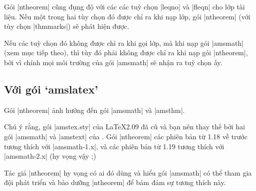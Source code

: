 Gói |ntheorem| cũng đụng độ với các các tuỳ chọn |leqno| và |fleqn| cho
lớp tài liệu. Nếu một trong hai tùy chọn đó được chỉ ra khi nạp lớp,
gói |ntheorem| (với tùy chọn |thmmarks|) sẽ phát hiện được.

\medskip
Nếu các tuỳ chọn đó không được chỉ ra khi gọi lớp, mà khi nạp gói |amsmath|
(xem mục tiếp theo), thì tùy đó phải không được chỉ ra khi nạp gói |ntheorem|,
bởi vì chính mọi môi trường của gói |amsmath| sẽ nhận ra tuỳ chọn ấy.

\subsection{\texorpdfstring{Với gói}{Voi goi} `amslatex'}
\label{sec:amslatex}

Gói |ntheorem| ảnh hưởng đến gói |amsmath| và |amsthm|.

\medskip
Chú ý rằng, gói |amstex.sty| của \LaTeX{}2.09 đã cũ và bạn nên thay thế
bởi hai gói |amsmath| và |amstext| của \LaTeXe{}. Gói |ntheorem| các phiên
bản từ 1.18 về trước tương thích với |amsmath-1.x|, và các phiên bản từ 1.19
tương thích với |amsmath-2.x| (hy vọng vậy ;)

\medskip
Tác giả |ntheorem| hy vọng có ai đó dùng và hiểu gói |amsmath| có thể
tham gia đội phát triển và bảo dưỡng |ntheorem| để bảm đảm sự tương thích này.

